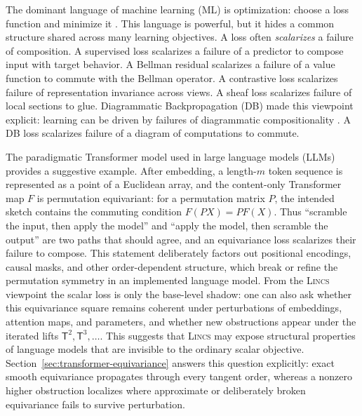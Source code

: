 \documentclass{article}
\newcommand{\T}{\mathsf{T}}
\begin{document}
The dominant language of machine learning (ML) is optimization: choose a loss function and minimize it  \citep{hastie2009elements,murphy2012machine,SuttonBarto2018}. 
This language is powerful, but it hides a common structure shared across many learning objectives. A loss often {\em scalarizes} a failure of composition. A supervised loss scalarizes a failure of a predictor to compose input with target behavior. A Bellman residual scalarizes a failure of a value function to commute with the Bellman operator. A contrastive loss scalarizes failure of representation invariance across views. A sheaf loss scalarizes failure of local sections to glue. Diagrammatic Backpropagation (DB) made this viewpoint explicit: learning can be driven by failures of diagrammatic compositionality \citep{mahadevan2026catagi}.  A DB loss scalarizes failure of a diagram of computations to commute.

The paradigmatic Transformer model used in large language models (LLMs) provides a suggestive example.  After embedding, a length-$m$
token sequence is represented as a point of a Euclidean array, and the
content-only Transformer map $F$ is permutation equivariant: for a permutation
matrix $P$, the intended sketch contains the commuting condition $F(PX)=P F(X)$. Thus ``scramble the input, then apply the model'' and ``apply the model, then
scramble the output'' are two paths that should agree, and an equivariance loss
scalarizes their failure to compose.  This statement deliberately factors out
positional encodings, causal masks, and other order-dependent structure, which
break or refine the permutation symmetry in an implemented language model.
From the \textsc{Lincs}   viewpoint the scalar loss is only the base-level shadow: one can
also ask whether this equivariance square remains coherent under perturbations
of embeddings, attention maps, and parameters, and whether new obstructions
appear under the iterated lifts $\T^2,\T^3,\ldots$.  This suggests that \textsc{Lincs}  
may expose structural properties of language models that are invisible to the
ordinary scalar objective.
Section~\ref{sec:transformer-equivariance} answers this question explicitly:
exact smooth equivariance propagates through every tangent order, whereas a
nonzero higher obstruction localizes where approximate or deliberately broken
equivariance fails to survive perturbation. 
\end{document}
